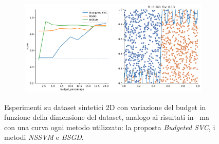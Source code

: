 \begin{figure}
\begin{subfigure}{.5\textwidth}
    \end{subfigure}%
    \hfill
    \begin{subfigure}{.5\textwidth}
        \centering
        \includegraphics[width=\textwidth]{img/comp_new/15.pdf}
    \end{subfigure}
\caption{Esperimenti su dataset sintetici 2D con variazione del budget in funzione della dimensione del dataset, analogo ai risultati in~ ma con una curva ogni metodo utilizzato: la proposta \emph{Budgeted SVC}, i metodi \emph{NSSVM} e \emph{BSGD}.}
\label{fig:comp_new_2}
\end{figure}   








